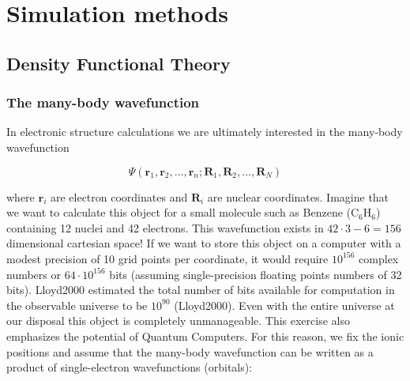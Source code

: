 \newcommand{\jp}{j^\prime}
\newcommand{\jpp}{j^{\prime\prime}}
\newcommand{\lp}{l^\prime}
\newcommand{\lpp}{l^{\prime\prime}}
\newcommand{\fc}{\bm{\Phi}\genfrac{(}{)}{0pt}{}{j \jp}{l \lp}}
\newcommand{\fczero}{\bm{\Phi}\genfrac{(}{)}{0pt}{}{j \jp}{0 \lp}}
\newcommand{\fcb}{\bm{\Theta}\genfrac{(}{)}{0pt}{}{j \jp}{l \lp}}
\newcommand{\fcbpp}{\bm{\Theta}\genfrac{(}{)}{0pt}{}{j \jpp}{l \lpp}}
\newcommand{\fcbf}{-\bm{\Theta}\genfrac{(}{)}{0pt}{}{j \jp}{l \lp} + \delta_{j,\jp} \delta_{l,\lp} \sum_{\jpp, \lpp}  \bm{\Theta}\genfrac{(}{)}{0pt}{}{j \jpp}{l \lpp} }
\newcommand*\tageq{\refstepcounter{equation}\tag{\theequation}}

\chapter{Simulation methods}

\section{Density Functional Theory}

\subsection{The many-body wavefunction}
In electronic structure calculations we are ultimately interested in the many-body wavefunction

\[ \Psi(\bm{r}_1,\bm{r}_2,\dots, \bm{r}_n; \bm{R}_1, \bm{R}_2, \dots , \bm{R}_N) \]

\noindent where $\bm{r}_i$ are electron coordinates and $\bm{R}_i$ are nuclear coordinates. Imagine that we want to calculate this object for a small molecule such as Benzene (C$_6$H$_6$) containing 12 nuclei and 42 electrons. This wavefunction exists in $42\cdot3-6 = 156$ dimensional cartesian space! If we want to store this object on a computer with a modest precision of 10 grid points per coordinate, it would require $10^{156}$ complex numbers or $64 \cdot 10^{156}$ bits (assuming single-precision floating points numbers of 32 bits). Lloyd2000 estimated the total number of bits available for computation in the observable universe to be $10^{90}$ (Lloyd2000). Even with the entire universe at our disposal this object is completely unmanageable. This exercise also emphasizes the potential of Quantum Computers. For this reason, we fix the ionic positions and assume that the many-body wavefunction can be written as a product of single-electron wavefunctions (orbitals):

